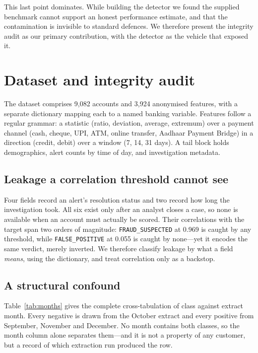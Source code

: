 \documentclass{article}
\begin{document}
This last point dominates. While building the detector we found the supplied
benchmark cannot support an honest performance estimate, and that the
contamination is invisible to standard defences. We therefore present the
integrity audit as our primary contribution, with the detector as the vehicle
that exposed it.

\section{Dataset and integrity audit}
\label{sec:data}

The dataset comprises 9,082 accounts and
3,924 anonymised features, with a separate dictionary
mapping each to a named banking variable. Features follow a regular grammar: a
statistic (ratio, deviation, average, extremum) over a payment channel (cash,
cheque, UPI, ATM, online transfer, Aadhaar Payment Bridge) in a direction
(credit, debit) over a window (7, 14, 31 days). A tail block holds demographics,
alert counts by time of day, and investigation metadata.

\subsection{Leakage a correlation threshold cannot see}

Four fields record an alert's resolution status and two record how long the
investigation took. All six exist only after an analyst closes a case, so none is
available when an account must actually be scored. Their correlations with the
target span two orders of magnitude: {\tt FRAUD\_SUSPECTED} at 0.969 is caught
by any threshold, while {\tt FALSE\_POSITIVE} at 0.055 is caught by none---yet
it encodes the same verdict, merely inverted. We therefore classify leakage by
what a field \emph{means}, using the dictionary, and treat correlation only as a
backstop.

\subsection{A structural confound}

Table~\ref{tab:months} gives the complete cross-tabulation of class against
extract month. Every negative is drawn from the October extract and every
positive from September, November and December. No month contains both classes,
so the month column alone separates them---and it is not a property of any
customer, but a record of which extraction run produced the row.
\end{document}
